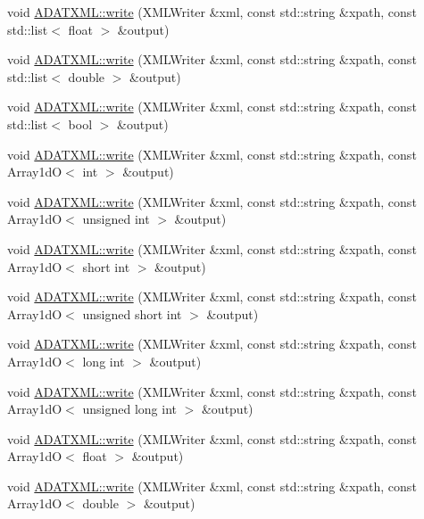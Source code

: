 \begin{DoxyCompactItemize}
\item 
void \mbox{\hyperlink{group__io_gaed1b6aaf88e89845ef30099ca6c5d933}{A\+D\+A\+T\+X\+M\+L\+::write}} (X\+M\+L\+Writer \&xml, const std\+::string \&xpath, const std\+::list$<$ float $>$ \&output)
\item 
void \mbox{\hyperlink{group__io_ga9b4f1b7647f914a90edb448dc7fbb4e9}{A\+D\+A\+T\+X\+M\+L\+::write}} (X\+M\+L\+Writer \&xml, const std\+::string \&xpath, const std\+::list$<$ double $>$ \&output)
\item 
void \mbox{\hyperlink{group__io_gaaeb2284c0481b6c39c20d3e2c283d933}{A\+D\+A\+T\+X\+M\+L\+::write}} (X\+M\+L\+Writer \&xml, const std\+::string \&xpath, const std\+::list$<$ bool $>$ \&output)
\item 
void \mbox{\hyperlink{group__io_gaa6e09c5b36ae52183896f9566e971ca5}{A\+D\+A\+T\+X\+M\+L\+::write}} (X\+M\+L\+Writer \&xml, const std\+::string \&xpath, const Array1dO$<$ int $>$ \&output)
\item 
void \mbox{\hyperlink{group__io_ga32f158a165ed5de5be9e8391eb747012}{A\+D\+A\+T\+X\+M\+L\+::write}} (X\+M\+L\+Writer \&xml, const std\+::string \&xpath, const Array1dO$<$ unsigned int $>$ \&output)
\item 
void \mbox{\hyperlink{group__io_ga0490b2b22643afb2ca599baccded2556}{A\+D\+A\+T\+X\+M\+L\+::write}} (X\+M\+L\+Writer \&xml, const std\+::string \&xpath, const Array1dO$<$ short int $>$ \&output)
\item 
void \mbox{\hyperlink{group__io_gada32aa6101427e2983e6507da6d49ff2}{A\+D\+A\+T\+X\+M\+L\+::write}} (X\+M\+L\+Writer \&xml, const std\+::string \&xpath, const Array1dO$<$ unsigned short int $>$ \&output)
\item 
void \mbox{\hyperlink{group__io_ga22d9e5badf27f6d860eeba79ca71243f}{A\+D\+A\+T\+X\+M\+L\+::write}} (X\+M\+L\+Writer \&xml, const std\+::string \&xpath, const Array1dO$<$ long int $>$ \&output)
\item 
void \mbox{\hyperlink{group__io_ga930bf7dd8f7a313ec5f29eacc08d06ba}{A\+D\+A\+T\+X\+M\+L\+::write}} (X\+M\+L\+Writer \&xml, const std\+::string \&xpath, const Array1dO$<$ unsigned long int $>$ \&output)
\item 
void \mbox{\hyperlink{group__io_ga83e5a11ea845805029325ff1c7946f36}{A\+D\+A\+T\+X\+M\+L\+::write}} (X\+M\+L\+Writer \&xml, const std\+::string \&xpath, const Array1dO$<$ float $>$ \&output)
\item 
void \mbox{\hyperlink{group__io_ga60a959cadded600c1c4768075005f76e}{A\+D\+A\+T\+X\+M\+L\+::write}} (X\+M\+L\+Writer \&xml, const std\+::string \&xpath, const Array1dO$<$ double $>$ \&output)

\end{DoxyCompactItemize}
